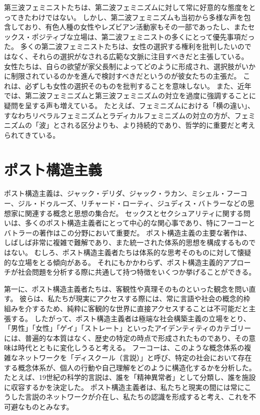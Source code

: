 \documentclass[paper=a4,book,openany]{jlreq} \usepackage{mystyle}
\begin{document}
第三波フェミニストたちは、第二波フェミニズムに対して常に好意的な態度をとってきたわけではない。
しかし、第二波フェミニズムも当初から多様な声を包含しており、有色人種の女性やレズビアン活動家もその一部であったし、またセックス・ポジティブな立場は、第二波フェミニストの多くにとって優先事項だった。
多くの第二波フェミニストたちは、女性の選択する権利を批判したいのではなく、それらの選択がなされる広範な文脈に注目すべきだと主張している。
女性たちは、自らの欲望が家父長制によってどのように形成され、選択肢がいかに制限されているのかを進んで検討すべきだというのが彼女たちの主張だ。
これは、必ずしも女性の選択そのものを批判することを意味しない。
また、近年では、第二波フェミニズムと第三波フェミニズムの対立を過度に強調することに疑問を呈する声も増えている。
たとえば、フェミニズムにおける「横の違い」、すなわちリベラルフェミニズムとラディカルフェミニズムの対立の方が、フェミニズムの「波」とされる区分よりも、より持続的であり、哲学的に重要だと考えられてきている。

\section{ポスト構造主義}

ポスト構造主義は、ジャック・デリダ、ジャック・ラカン、ミシェル・フーコー、ジル・ドゥルーズ、リチャード・ローティ、ジュディス・バトラーなどの思想家に関連する概念と思想の集合だ。
セックスとセクシュアリティに関する問いは、多くのポスト構造主義者にとって中心的な関心事であり、特にフーコーとバトラーの著作はこの分野において重要だ。
ポスト構造主義の主要な著作は、しばしば非常に複雑で難解であり、また統一された体系的思想を構成するものではない。
むしろ、ポスト構造主義者たちは体系的な思考そのものに対して懐疑的な立場をとる傾向がある。
それにもかかわらず、ポスト構造主義的アプローチが社会問題を分析する際に共通して持つ特徴をいくつか挙げることができる。

第一に、ポスト構造主義者たちは、客観性や真理そのものといった観念を問い直す。
彼らは、私たちが現実にアクセスする際には、常に言語や社会の概念的枠組みを介するため、純粋に客観的な世界に直接アクセスすることは不可能だと主張する。
したがって、ポスト構造主義者は極端な社会構築主義の立場をとり、「男性」「女性」「ゲイ」「ストレート」といったアイデンティティのカテゴリーには、普遍的な本質はなく、歴史の特定の時点で形成されたものであり、その意味は時代とともに変化しうると考える。
フーコーは、このような概念体系の複雑なネットワークを「ディスクール（言説）」と呼び、特定の社会において存在する概念体系が、個人の行動や自己理解をどのように構造化するかを分析した。
たとえば、19世紀の科学的言説は、誰を「精神異常者」として分類し、誰を施設に収容するかを決定した。
ポスト構造主義者は、私たちと現実の間には常にこうした言説のネットワークが介在し、私たちの認識を形成すると考え、これを不可避なものとみなす。
\end{document}

